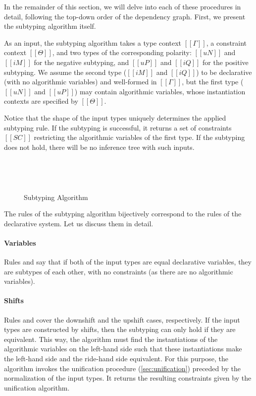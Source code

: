 In the remainder of this section, we will delve into each of these procedures in
detail, following the top-down order of the dependency graph. First, 
we present the subtyping algorithm itself.

As an input, the subtyping algorithm takes
a type context $[[Γ]]$, a constraint context $[[Θ]]$,
and two types of the corresponding polarity:
$[[uN]]$ and  $[[iM]]$ for the negative subtyping, and
$[[uP]]$ and  $[[iQ]]$ for the positive subtyping.
We assume the second type ($[[iM]]$ and $[[iQ]]$) to be 
declarative (with no algorithmic variables) and well-formed in $[[Γ]]$,
but the first type ($[[uN]]$ and $[[uP]]$) may contain algorithmic variables,
whose instantiation contexts are specified by $[[Θ]]$.

Notice that the shape of the input types uniquely determines the
applied subtyping rule.  If the subtyping is successful, it returns
a set of constraints $[[SC]]$ restricting the algorithmic 
variables of the first type. If the subtyping does not hold, 
there will be no inference tree with such inputs. 

\begin{figure}[h]
  \hfill\\
  \begin{multicols}{2}
    \ottdefnANsubLabeled{}
    \columnbreak\\
    \ottdefnAPsupLabeled{}
  \end{multicols}
  \caption{Subtyping Algorithm}
  \label{fig:alg-subtyping}
\end{figure}

The rules of the subtyping algorithm bijectively correspond to the rules of the declarative
system. Let us discuss them in detail.

\paragraph{Variables} Rules  and 
say that if both of the input types are equal declarative variables,
they are subtypes of each other, with no constraints (as there are no algorithmic variables).

\paragraph{Shifts} Rules  and
 cover the downshift and the upshift cases,
respectively. If the input types are constructed by shifts, then the subtyping
can only hold if they are equivalent. This way, the algorithm must find the
instantiations of the algorithmic variables on the left-hand side
such that these instantiations make the left-hand side and the ride-hand side
equivalent. For this purpose, the algorithm invokes the
unification procedure (\cref{sec:unification}) preceded by the normalization of the input types.
It returns the resulting constraints given by the unification algorithm. 

